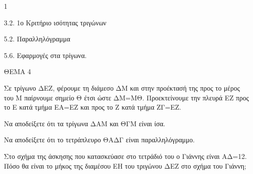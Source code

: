 \begin{ylh}{1}
    \item 3.2. 1ο Κριτήριο ισότητας τριγώνων
    \item 5.2. Παραλληλόγραμμα
    \item 5.6. Εφαρμογές στα τρίγωνα.
\end{ylh}

ΘΕΜΑ 4

Σε τρίγωνο ΔΕΖ, φέρουμε τη διάμεσο ΔΜ και στην προέκτασή της προς το μέρος του Μ παίρνουμε σημείο Θ έτσι ώστε ΔΜ=ΜΘ. Προεκτείνουμε την πλευρά ΕΖ προς το Ε κατά τμήμα ΕΑ=ΕΖ και προς το Ζ κατά τμήμα ΖΓ=ΕΖ.

\begin{alist}
\item Να αποδείξετε ότι τα τρίγωνα ΔΑΜ και ΘΓΜ είναι ίσα. 

\item Να αποδείξετε ότι το τετράπλευρο ΘΑΔΓ είναι παραλληλόγραμμο. 

\item Στο σχήμα της άσκησης που κατασκεύασε στο τετράδιό του ο Γιάννης είναι ΑΔ=12. Πόσο θα είναι το μήκος της διαμέσου ΕΗ του τριγώνου ΔΕΖ στο σχήμα του Γιάννη; 
\end{alist}
